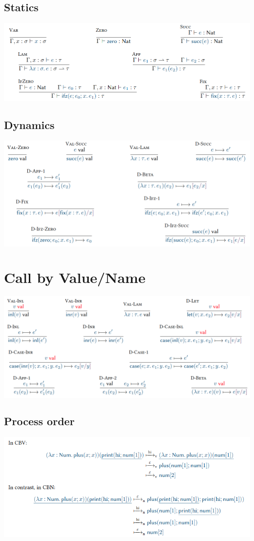 \documentclass[11pt,a4paper,titlepage,dvipsnames,cmyk]{scrartcl}
\begin{document}
\subsection{Statics}
\includegraphics[width=\textwidth]{pics/static-pcf.png}
\subsection{Dynamics}
\includegraphics[width=\textwidth]{pics/dynamic-pcf.png}

\newpage
\section{Call by Value/Name}
\includegraphics[width=\textwidth]{pics/cbv.png}

\subsection{Process order}
\includegraphics[width=\textwidth]{pics/cbnvscbv.png}
\end{document}
